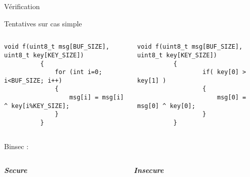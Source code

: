 \documentclass[A4,svgnames,9pt,aspectratio=169]{beamer}
\begin{document}
\begin{frame}{Vérification}

  
  \begin{block}{Tentatives sur cas simple}
    \begin{columns}
      \begin{column}{0.5\textwidth}
        \begin{lstlisting}[style=CStyle, caption={good\_ct.c}, gobble=10]
          void f(uint8_t msg[BUF_SIZE], uint8_t key[KEY_SIZE])
          {
              for (int i=0; i<BUF_SIZE; i++)
              {
                  msg[i] = msg[i] ^ key[i%KEY_SIZE];
              }
          }
        \end{lstlisting}
      \end{column}
      \begin{column}{0.5\textwidth}
        \begin{lstlisting}[style=CStyle, caption={bad\_ct.c}, gobble=10]
          void f(uint8_t msg[BUF_SIZE], uint8_t key[KEY_SIZE])
          {
                  if( key[0] > key[1] )
                  {
                      msg[0] = msg[0] ^ key[0];    
                  }
          }
        \end{lstlisting}
      \end{column}
    \end{columns}
  \end{block}
  \vspace{0.5cm}
  \begin{block}{Binsec :}
    \begin{columns}
      \begin{column}{0.5\textwidth}
        \begin{center}
          \textit{\textbf{Secure}}
        \end{center}
        \vfill
      \end{column}
      \begin{column}{0.5\textwidth}
        \begin{center}
          \textit{\textbf{Insecure}}
        \end{center}
        \vfill
      \end{column}
    \end{columns}
  \end{block}
\end{frame}

\end{document}

